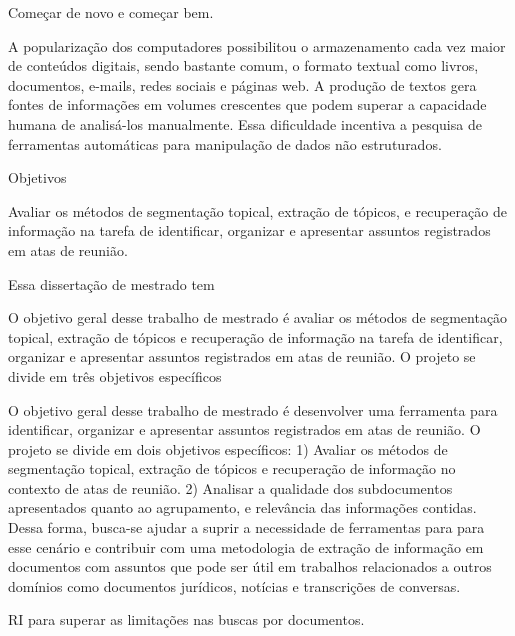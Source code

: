 




















Começar de novo e começar bem.


A popularização dos computadores possibilitou o armazenamento cada vez maior de conteúdos digitais, sendo bastante comum, o formato textual como livros, documentos, e-mails, redes sociais e páginas web. A produção de textos gera fontes de informações em volumes crescentes que podem superar a capacidade humana de analisá-los manualmente. Essa dificuldade incentiva a pesquisa de ferramentas automáticas para manipulação de dados não estruturados. 

Objetivos

	Avaliar os métodos de segmentação topical, extração de tópicos, e recuperação de informação na
tarefa de identificar, organizar e apresentar assuntos registrados em atas de reunião.



Essa dissertação de mestrado tem 

O objetivo geral desse trabalho de mestrado é avaliar os métodos de segmentação topical, extração de tópicos e recuperação de informação na tarefa de identificar, organizar e apresentar assuntos registrados em atas de reunião. O projeto se divide em três objetivos específicos 

O objetivo geral desse trabalho de mestrado é desenvolver uma ferramenta para identificar, organizar e apresentar assuntos registrados em atas de reunião. O projeto se divide em dois objetivos específicos: 1) Avaliar os métodos de segmentação topical, extração de tópicos e recuperação de informação no contexto de atas de reunião. 2) Analisar a qualidade dos subdocumentos apresentados quanto ao agrupamento, e relevância das informações contidas.
Dessa forma, busca-se ajudar a suprir a necessidade de ferramentas para para esse cenário e contribuir com uma metodologia de extração de informação em documentos com assuntos que pode ser útil em trabalhos relacionados a outros domínios como documentos jurídicos, notícias e transcrições de conversas.





RI para superar as limitações nas buscas por documentos.

